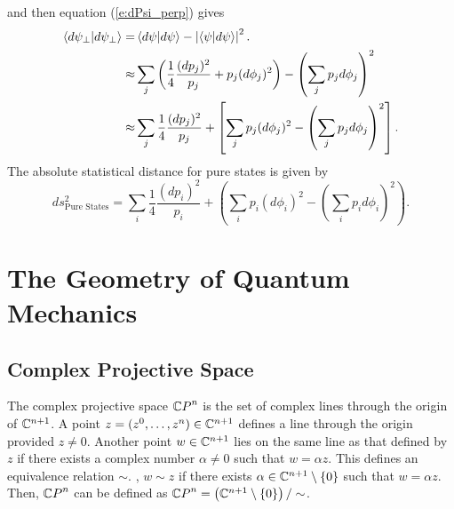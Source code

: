 and then equation (\ref{e:dPsi_perp}) gives
\begin{equation}
\begin{split}
    {\langle{d\psi_\perp}|{d\psi_\perp}\rangle} 
        =&\, {\langle{d\psi}|{d\psi}\rangle} - \left| {\langle{\psi}|{d\psi}\rangle} \right|^2.\\
        \approx& \sum_j 
                    \left( 
                           \frac{1}{4}\frac{(dp_j)^2}{p_j}
                           +p_j(d\phi_j)^2
                    \right)
            - \left( \sum_jp_jd\phi_j \right)^2\\
        \approx& \sum_j \frac{1}{4}\frac{(dp_j)^2}{p_j}
                  + \left[ 
                           \sum_j p_j(d\phi_j)^2
                           - \left( \sum_jp_jd\phi_j \right)^2
                    \right].
\end{split}
\end{equation}
The absolute statistical distance for pure states is given by
\begin{equation}
                ds_{\text{Pure States}}^2 = \sum_i \frac{1}{4}\frac{(dp_i)^2}{p_i} + 
                \left( 
                    \sum_i p_i(d\phi_i)^2 - \left( \sum_i p_i d\phi_i \right)^2
                \right).
\label{e:fsStatistical}
\end{equation}

\section{The Geometry of Quantum Mechanics}
\label{sec:geometryQM}

\subsection{Complex Projective Space}

The complex projective space ${\mathbb{C} P}^n$ is the set of complex lines
through the origin of ${\mathbb{C}}^{n+1}$.
A point $z=(z^0,\ldots,z^n)\in{\mathbb{C}}^{n+1}$ defines a line through
the origin provided $z\ne 0$.
Another point $w\in{\mathbb{C}}^{n+1}$ lies on the same line as that
defined by $z$ if there exists a complex number $\alpha\ne 0$
such that $w=\alpha z$.  This defines an equivalence relation $\sim$.
\ie, $w\sim z$ if there exists $\alpha\in{\mathbb{C}}^{n+1}\setminus\lbrace 0\rbrace$
such that $w=\alpha z$.  Then, ${\mathbb{C} P}^n$ can be defined as 
${\mathbb{C} P}^n=\left( {\mathbb{C}}^{n+1}\setminus\lbrace 0\rbrace\right)/\sim$.

